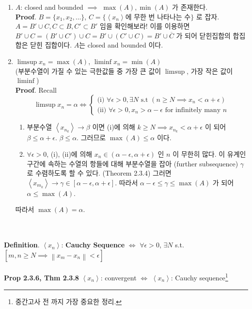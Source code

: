 \documentclass[12pt]{report}
\newcommand{\norm}[1]{\left\lVert#1\right\rVert}
\renewcommand{\span}[1]{\left\langle #1 \right\rangle}
\newcommand{\ra}{\rightarrow}
\newcommand{\imp}{\implies}
\begin{document}
\begin{enumerate}
	\item $A$: closed and bounded $\imp$ $\max(A), \min(A)$ 가 존재한다.\\
	\textbf{Proof}. $B= \{x_1, x_2, \dots \}$, $C = \{ \span{x_n} \text{에 무한 번 나타나는 수} \}$ 로 잡자. $A = B'\cup C, C\subset B, C'\subset B'$ 임을 확인해보라! 이를 이용하면 $B'\cup C = (B'\cup C')\cup C = B'\cup (C'\cup C) = B'\cup \overline{C}$ 가 되어 닫힌집합의 합집합은 닫힌 집합이다. $A$는 closed and bounded 이다.
	\item $\limsup x_n = \max(A)$, $\liminf x_n=\min(A)$\\
	(부분수열이 가질 수 있는 극한값들 중 가장 큰 값이 $ \limsup $, 가장 작은 값이 $ \liminf $)\\
	\textbf{Proof}. Recall\\
	$$ \limsup x_n = \alpha \iff \begin{cases}
		\text{(i) } \forall\epsilon > 0, \exists N \text{ s.t } (n\geq N\imp x_n<\alpha+\epsilon) \\
		\text{(ii) } \forall \epsilon>0, x_n>\alpha-\epsilon \text{ for infinitely many }n
	\end{cases} $$
	\begin{enumerate}
		\item 부분수열 $\span{x_{n_k}}\ra \beta$ 이면 (i)에 의해 $k\geq N \imp x_{n_k}<\alpha+\epsilon$ 이 되어 $\beta \leq \alpha + \epsilon$. $\beta \leq \alpha$. 그러므로 $\max(A) \leq \alpha$ 이다.
		\item $\forall \epsilon>0$, (i), (ii)에 의해 $x_n\in (\alpha-\epsilon, \alpha+\epsilon)$ 인 $n$ 이 무한히 많다. 이 유계인 구간에 속하는 수열의 항들에 대해 부분수열을 잡아 (further subsequence) $\gamma$ 로 수렴하도록 할 수 있다. (Theorem 2.3.4) 그러면 $\span{x_{m_k}} \ra \gamma \in [\alpha-\epsilon, \alpha+\epsilon]$. 따라서 $\alpha-\epsilon\leq \gamma\leq \max(A)$ 가 되어 $\alpha \leq \max(A)$.
	\end{enumerate}
	따라서 $\max(A) = \alpha$.
\end{enumerate}~\\
\\
\textbf{Definition}. $\span{x_n}$: \textbf{Cauchy Sequence} $\iff$ $\forall\epsilon>0$, $\exists N$ s.t. $[m, n\geq N \imp \norm{x_m-x_n}<\epsilon]$\\
\\
\textbf{Prop 2.3.6, Thm 2.3.8} $\span{x_n}$: convergent $\iff$ $\span{x_n}$: Cauchy sequence\footnote{중간고사 전 까지 가장 중요한 정리.}\\
\end{document}
